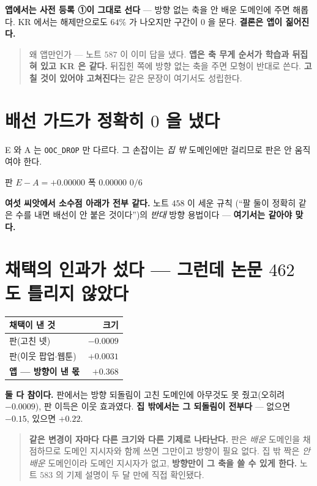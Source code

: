 \documentclass[11pt]{article}
\begin{document}
\textbf{앱에서는 사전 등록 ①이 그대로 선다} --- 방향 없는 축을 안 배운
도메인에 주면 해롭다. KR 에서는 해제만으로도 $64\%$ 가 나오지만 구간이
$0$ 을 문다. \textbf{결론은 앱이 짊어진다.}

\begin{quote}
왜 앱만인가 --- 노트 $587$ 이 이미 답을 냈다. \textbf{앱은 축 무게 순서가
학습과 뒤집혀 있고 KR 은 같다.} 뒤집힌 쪽에 방향 없는 축을 주면 모형이
반대로 쓴다. \textbf{고칠 것이 있어야 고쳐진다}는 같은 문장이 여기서도
성립한다.
\end{quote}

\section{배선 가드가 정확히 $0$ 을 냈다}

E 와 A 는 \texttt{OOC\_DROP} 만 다르다. 그 손잡이는 \emph{집 밖} 도메인에만
걸리므로 판은 안 움직여야 한다.

\begin{center}
판 $E - A = \mathbf{+0.00000}$ \quad 폭 $\mathbf{0.00000}$ \quad $0/6$
\end{center}

\textbf{여섯 씨앗에서 소수점 아래가 전부 같다.} 노트 $458$ 이 세운 규칙
(``팔 둘이 정확히 같은 수를 내면 배선이 안 붙은 것이다'')의 \emph{반대}
방향 용법이다 --- \textbf{여기서는 같아야 맞다.}

\section{채택의 인과가 섰다 --- 그런데 논문 $462$ 도 틀리지 않았다}

\begin{center}
\begin{tabular}{lr}
\hline
채택이 낸 것 & 크기 \\
\hline
판(고친 넷) & $\mathbf{-0.0009}$ \\
판(이웃 팝업$\cdot$웹툰) & $+0.0031$ \\
\textbf{앱 --- 방향이 낸 몫} & $\mathbf{+0.368}$ \\
\hline
\end{tabular}
\end{center}

\textbf{둘 다 참이다.} 판에서는 방향 되돌림이 고친 도메인에 아무것도 못
줬고(오히려 $-0.0009$), 판 이득은 이웃 효과였다. \textbf{집 밖에서는 그
되돌림이 전부다} --- 없으면 $-0.15$, 있으면 $+0.22$.

\begin{quote}
\textbf{같은 변경이 자마다 다른 크기와 다른 기제로 나타난다.} 판은
\emph{배운} 도메인을 채점하므로 도메인 지시자와 함께 쓰면 그만이고 방향이
필요 없다. 집 밖 짝은 \emph{안 배운} 도메인이라 도메인 지시자가 없고,
\textbf{방향만이 그 축을 쓸 수 있게 한다.} 노트 $583$ 의 기제 설명이 두 달
만에 직접 확인됐다.
\end{quote}
\end{document}
